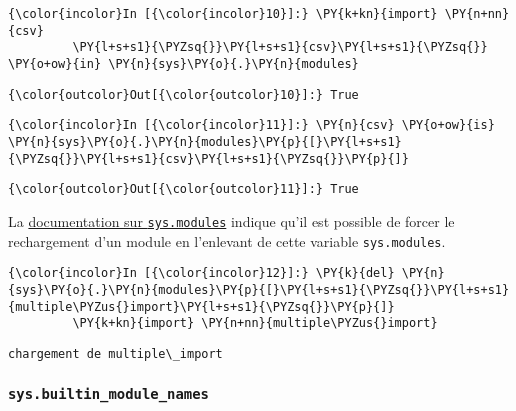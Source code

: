     \begin{Verbatim}[commandchars=\\\{\}]
{\color{incolor}In [{\color{incolor}10}]:} \PY{k+kn}{import} \PY{n+nn}{csv}
         \PY{l+s+s1}{\PYZsq{}}\PY{l+s+s1}{csv}\PY{l+s+s1}{\PYZsq{}} \PY{o+ow}{in} \PY{n}{sys}\PY{o}{.}\PY{n}{modules}
\end{Verbatim}


\begin{Verbatim}[commandchars=\\\{\}]
{\color{outcolor}Out[{\color{outcolor}10}]:} True
\end{Verbatim}
            
    \begin{Verbatim}[commandchars=\\\{\}]
{\color{incolor}In [{\color{incolor}11}]:} \PY{n}{csv} \PY{o+ow}{is} \PY{n}{sys}\PY{o}{.}\PY{n}{modules}\PY{p}{[}\PY{l+s+s1}{\PYZsq{}}\PY{l+s+s1}{csv}\PY{l+s+s1}{\PYZsq{}}\PY{p}{]}
\end{Verbatim}


\begin{Verbatim}[commandchars=\\\{\}]
{\color{outcolor}Out[{\color{outcolor}11}]:} True
\end{Verbatim}
            
    La
\href{https://docs.python.org/3/library/sys.html\#sys.modules}{documentation
sur \texttt{sys.modules}} indique qu'il est possible de forcer le
rechargement d'un module en l'enlevant de cette variable
\texttt{sys.modules}.

    \begin{Verbatim}[commandchars=\\\{\}]
{\color{incolor}In [{\color{incolor}12}]:} \PY{k}{del} \PY{n}{sys}\PY{o}{.}\PY{n}{modules}\PY{p}{[}\PY{l+s+s1}{\PYZsq{}}\PY{l+s+s1}{multiple\PYZus{}import}\PY{l+s+s1}{\PYZsq{}}\PY{p}{]}
         \PY{k+kn}{import} \PY{n+nn}{multiple\PYZus{}import}
\end{Verbatim}


    \begin{Verbatim}[commandchars=\\\{\}]
chargement de multiple\_import

    \end{Verbatim}

    \hypertarget{sys.builtin_module_names}{%
\subsubsection{\texorpdfstring{\texttt{sys.builtin\_module\_names}}{sys.builtin\_module\_names}}\label{sys.builtin_module_names}}

